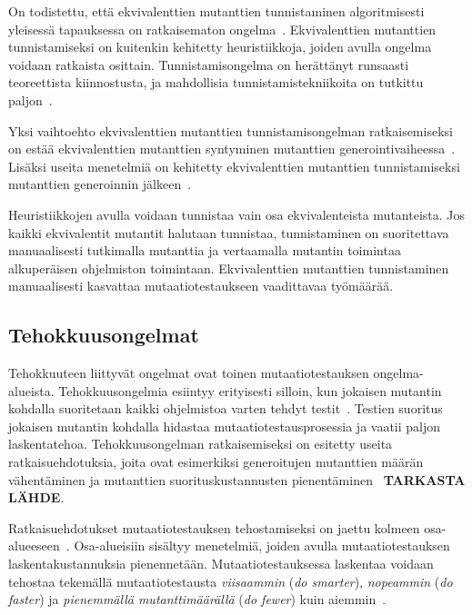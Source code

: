 \documentclass[finnish, grading]{tktltiki2}
\theoremstyle{definition}
\theoremstyle{remark}
\begin{document}
\vspace{1\baselineskip}On todistettu, että ekvivalenttien mutanttien tunnistaminen algoritmisesti yleisessä tapauksessa on ratkaisematon ongelma~\cite[s. 79]{Offutt:Ma:Kwon:2006:MuClassLevel}. Ekvivalenttien mutanttien tunnistamiseksi on kuitenkin kehitetty heuristiikkoja, joiden avulla ongelma voidaan ratkaista osittain. Tunnistamisongelma on herättänyt runsaasti teoreettista kiinnostusta, ja mahdollisia tunnistamistekniikoita on tutkittu paljon~\cite[s. 657]{Jia:Harman:2011}. 

Yksi vaihtoehto ekvivalenttien mutanttien tunnistamisongelman ratkaisemiseksi on estää ekvivalenttien mutanttien syntyminen mutanttien generointivaiheessa~\cite[s. 80]{Offutt:Ma:Kwon:2006:MuClassLevel}. Lisäksi useita menetelmiä on kehitetty ekvivalenttien mutanttien tunnistamiseksi mutanttien generoinnin jälkeen~\cite[s. 79-80]{Offutt:Ma:Kwon:2006:MuClassLevel}.

Heuristiikkojen avulla voidaan tunnistaa vain osa ekvivalenteista mutanteista. Jos kaikki ekvivalentit mutantit halutaan tunnistaa, tunnistaminen on suoritettava manuaalisesti tutkimalla mutanttia ja vertaamalla mutantin toimintaa alkuperäisen ohjelmiston toimintaan. Ekvivalenttien mutanttien tunnistaminen manuaalisesti kasvattaa mutaatiotestaukseen vaadittavaa työmäärää.

\subsection{Tehokkuusongelmat}

Tehokkuuteen liittyvät ongelmat ovat toinen mutaatiotestauksen ongelma-alueista. Tehokkuusongelmia esiintyy erityisesti silloin, kun jokaisen mutantin kohdalla suoritetaan kaikki ohjelmistoa varten tehdyt testit~\cite[s. 652]{Jia:Harman:2011}. Testien suoritus jokaisen mutantin kohdalla hidastaa mutaatiotestausprosessia ja vaatii paljon laskentatehoa. Tehokkuusongelman ratkaisemiseksi on esitetty useita ratkaisuehdotuksia, joita ovat esimerkiksi generoitujen mutanttien määrän vähentäminen ja mutanttien suorituskustannusten pienentäminen~\cite[s. 653-656]{Jia:Harman:2011} \textbf{TARKASTA LÄHDE}.

Ratkaisuehdotukset mutaatiotestauksen tehostamiseksi on jaettu kolmeen osa-alueeseen~\cite[s. 37]{Offutt:Untch:2001}. Osa-alueisiin sisältyy menetelmiä, joiden avulla mutaatiotestauksen laskentakustannuksia pienennetään. Mutaatiotestauksessa laskentaa voidaan tehostaa tekemällä mutaatiotestausta \textit{viisaammin} (\textit{do smarter}), \textit{nopeammin} (\textit{do faster}) ja \textit{pienemmällä mutanttimäärällä} (\textit{do fewer}) kuin aiemmin~\cite[s. 37]{Offutt:Untch:2001}.
\end{document}
